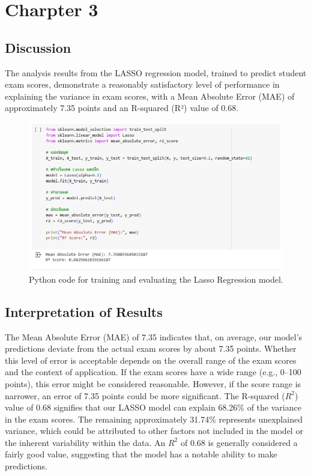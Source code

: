 \documentclass[a4paper,12pt]{article}
\begin{document}
		
\section{Charpter 3}
	\subsection{Discussion}
	The analysis results from the LASSO regression model, trained to predict student exam scores, demonstrate a reasonably satisfactory level of performance in explaining the variance in exam scores, with a Mean Absolute Error (MAE) of approximately 7.35 points and an R-squared (R²) value of 0.68.
	
	
\begin{figure}[H]
	\centering
	\includegraphics[width=1\textwidth]{pic90.png} %
	\caption{Python code for training and evaluating the Lasso Regression model.}
	\label{fig:lasso-code}
\end{figure}
	
	
	
	\subsection{Interpretation of Results}
	
	The Mean Absolute Error (MAE) of 7.35 indicates that, on average, our model's predictions deviate from the actual exam scores by about 7.35 points. Whether this level of error is acceptable depends on the overall range of the exam scores and the context of application. If the exam scores have a wide range (e.g., 0--100 points), this error might be considered reasonable. However, if the score range is narrower, an error of 7.35 points could be more significant.
	\vspace{0.5cm}
	The R-squared ($R^2$) value of 0.68 signifies that our LASSO model can explain 68.26\% of the variance in the exam scores. The remaining approximately 31.74\% represents unexplained variance, which could be attributed to other factors not included in the model or the inherent variability within the data. An $R^2$ of 0.68 is generally considered a fairly good value, suggesting that the model has a notable ability to make predictions.
	
\end{document}
